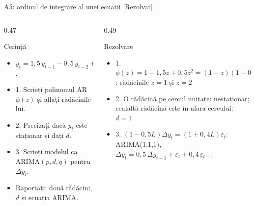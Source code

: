 \begin{frame}{A5: ordinul de integrare al unei ecuații [Rezolvat]}
\itemsize{\scriptsize}
\begin{columns}[T]
\begin{column}{0.47\textwidth}
\begin{block}{Cerință}
\begin{itemize}
    \item $y_t = 1{,}5\,y_{t-1} - 0{,}5\,y_{t-2} + \varepsilon_t + 0{,}4\,\varepsilon_{t-1}$.
    \item 1. Scrieți polinomul AR $\phi(z)$ și aflați rădăcinile lui.
    \item 2. Precizați dacă $y_t$ este staționar și dați $d$.
    \item 3. Scrieți modelul ca ARIMA$(p,d,q)$ pentru $\Delta y_t$.
    \item Raportați: două rădăcini, $d$ și ecuația ARIMA.
\end{itemize}
\end{block}
\end{column}
\begin{column}{0.49\textwidth}
\begin{exampleblock}{Rezolvare}
\begin{itemize}
    \item 1. $\phi(z) = 1 - 1{,}5z + 0{,}5z^2 = (1 - z)(1 - 0{,}5z)$: rădăcinile $z = 1$ și $z = 2$
    \item 2. O rădăcină pe cercul unitate: nestaționar; cealaltă rădăcină este în afara cercului: $d = 1$
    \item 3. $(1 - 0{,}5L)\Delta y_t = (1 + 0{,}4L)\varepsilon_t$: ARIMA(1,1,1), $\Delta y_t = 0{,}5\,\Delta y_{t-1} + \varepsilon_t + 0{,}4\,\varepsilon_{t-1}$
\end{itemize}
\end{exampleblock}
\end{column}
\end{columns}
\end{frame}

